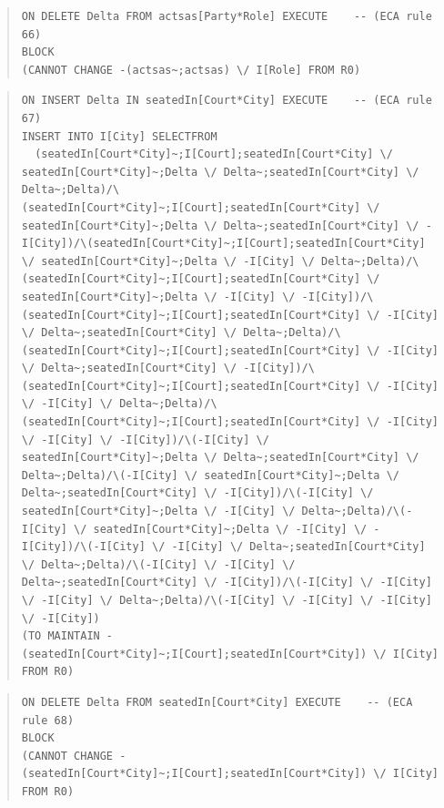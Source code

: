\documentclass[10pt,a4paper]{report}              %
\theoremstyle{plain}\theorembodyfont{\rmfamily}\newtheorem{definition}{Definition}[section]
\theoremstyle{plain}\theorembodyfont{\rmfamily}\newtheorem{designrule}[definition]{Requirement}
\begin{document}
\begin{quote}
\begin{verbatim}
ON DELETE Delta FROM actsas[Party*Role] EXECUTE    -- (ECA rule 66)
BLOCK
(CANNOT CHANGE -(actsas~;actsas) \/ I[Role] FROM R0)
\end{verbatim}
\end{quote}
\begin{quote}
\begin{verbatim}
ON INSERT Delta IN seatedIn[Court*City] EXECUTE    -- (ECA rule 67)
INSERT INTO I[City] SELECTFROM
  (seatedIn[Court*City]~;I[Court];seatedIn[Court*City] \/ seatedIn[Court*City]~;Delta \/ Delta~;seatedIn[Court*City] \/ Delta~;Delta)/\(seatedIn[Court*City]~;I[Court];seatedIn[Court*City] \/ seatedIn[Court*City]~;Delta \/ Delta~;seatedIn[Court*City] \/ -I[City])/\(seatedIn[Court*City]~;I[Court];seatedIn[Court*City] \/ seatedIn[Court*City]~;Delta \/ -I[City] \/ Delta~;Delta)/\(seatedIn[Court*City]~;I[Court];seatedIn[Court*City] \/ seatedIn[Court*City]~;Delta \/ -I[City] \/ -I[City])/\(seatedIn[Court*City]~;I[Court];seatedIn[Court*City] \/ -I[City] \/ Delta~;seatedIn[Court*City] \/ Delta~;Delta)/\(seatedIn[Court*City]~;I[Court];seatedIn[Court*City] \/ -I[City] \/ Delta~;seatedIn[Court*City] \/ -I[City])/\(seatedIn[Court*City]~;I[Court];seatedIn[Court*City] \/ -I[City] \/ -I[City] \/ Delta~;Delta)/\(seatedIn[Court*City]~;I[Court];seatedIn[Court*City] \/ -I[City] \/ -I[City] \/ -I[City])/\(-I[City] \/ seatedIn[Court*City]~;Delta \/ Delta~;seatedIn[Court*City] \/ Delta~;Delta)/\(-I[City] \/ seatedIn[Court*City]~;Delta \/ Delta~;seatedIn[Court*City] \/ -I[City])/\(-I[City] \/ seatedIn[Court*City]~;Delta \/ -I[City] \/ Delta~;Delta)/\(-I[City] \/ seatedIn[Court*City]~;Delta \/ -I[City] \/ -I[City])/\(-I[City] \/ -I[City] \/ Delta~;seatedIn[Court*City] \/ Delta~;Delta)/\(-I[City] \/ -I[City] \/ Delta~;seatedIn[Court*City] \/ -I[City])/\(-I[City] \/ -I[City] \/ -I[City] \/ Delta~;Delta)/\(-I[City] \/ -I[City] \/ -I[City] \/ -I[City])
(TO MAINTAIN -(seatedIn[Court*City]~;I[Court];seatedIn[Court*City]) \/ I[City] FROM R0)
\end{verbatim}
\end{quote}
\begin{quote}
\begin{verbatim}
ON DELETE Delta FROM seatedIn[Court*City] EXECUTE    -- (ECA rule 68)
BLOCK
(CANNOT CHANGE -(seatedIn[Court*City]~;I[Court];seatedIn[Court*City]) \/ I[City] FROM R0)
\end{verbatim}
\end{quote}
\end{document}
